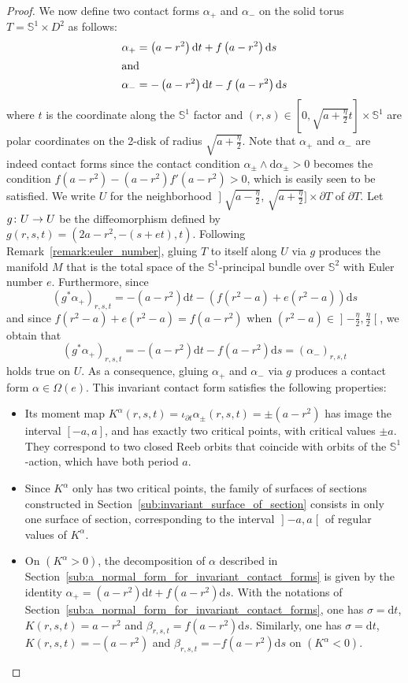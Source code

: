 \documentclass[AHL,Unicode,longabstracts]{cedram}
\newcommand{\bbS}{\mathbb{S}}
\newcommand{\rmd}{\mathrm{d}}
\renewcommand*{\to}{\mathchoice{\longrightarrow}{\rightarrow}{\rightarrow}{\rightarrow}}
\newcommand{\bbS}{\mathbb{S}}
\begin{document}
\begin{proof}
We now define two contact forms $\alpha_+$ and $\alpha_-$ on the solid torus $T = \bbS^1 \times D^2$ as follows:
\begin{align*}
\alpha_+ &= \left(a-r^2\right)\rmd t + f\left(a-r^2\right) \rmd s
\\
\intertext{and}
\alpha_- &= -\left(a-r^2\right)\rmd t - f\left(a-r^2\right) \rmd s
\end{align*}
where $t$ is the coordinate along the $\bbS^1$ factor and $(r,s) \in [0, \sqrt{a+\frac{\eta}{2}}t] \times \bbS^1$ are polar coordinates on the 2-disk of radius $\sqrt{a+ \frac{\eta}{2}}$. Note that $\alpha_+$ and $\alpha_-$ are indeed contact forms since the contact condition $\alpha_\pm \wedge \rmd  \alpha_\pm > 0$ becomes the condition $f(a-r^2) - (a-r^2) f'(a-r^2) >0$, which is easily seen to be satisfied. We write $U$ for the neighborhood $\mathopen{]}\sqrt{a-\frac{\eta}{2}}$, $\sqrt{a+\frac{\eta}{2}}\mathclose{]} \times \partial T$ of $\partial T$. Let $g \colon U \to U$ be the diffeomorphism defined by $g(r,s,t) = (2a-r^2,-(s+et),t)$. Following Remark~\ref{remark:euler_number}, gluing $T$ to itself along $U$ via $g$ produces the manifold $M$ that is the total space of the $\bbS^1$-principal bundle over $\bbS^2$ with Euler number $e$. Furthermore, since
\[
\left(g^* \alpha_+\right)_{r,s,t} = -\left(a-r^2\right) \rmd t - \left(f\left(r^2-a\right) + e\left(r^2-a\right)\right) \rmd s
\]
and since $f(r^2-a) + e (r^2-a) = f(a-r^2)$ when $(r^2-a) \in\mathopen{]}- \frac{\eta}{2}, \frac{\eta}{2}\mathclose{[}$, we obtain that
\[
(g^* \alpha_+)_{r,s,t} = - \left(a-r^2\right) \rmd t - f\left(a-r^2\right) \rmd s = (\alpha_-)_{r,s,t}
\]
holds true on $U$. As a consequence, gluing $\alpha_+$ and $\alpha_-$ via $g$ produces a contact form $\alpha \in \Omega(e)$. This invariant contact form satisfies the following properties:
\begin{itemize}
\item Its moment map $K^\alpha(r,s,t) = \iota_{\partial t} \alpha_{\pm}(r,s,t) = \pm (a-r^2)$ has image the interval $[-a,a]$, and has exactly two critical points, with critical values $\pm a$. They correspond to two closed Reeb orbits that coincide with orbits of the $\bbS^1$-action, which have both period $a$.
\item Since $K^\alpha$ only has two critical points, the family of surfaces of sections constructed in Section~\ref{sub:invariant_surface_of_section} consists in only one surface of section, corresponding to the interval $\mathopen{]}-a,a\mathclose{[}$ of regular values of $K^\alpha$.
\item On $(K^\alpha>0)$, the decomposition of $\alpha$ described in Section~\ref{sub:a_normal_form_for_invariant_contact_forms} is given by the identity $\alpha_+ = (a-r^2)\rmd t + f(a-r^2) \rmd s$. With the notations of Section~\ref{sub:a_normal_form_for_invariant_contact_forms}, one has $\sigma = \rmd t$, $K(r,s,t)=a-r^2$ and $\beta_{r,s,t} = f(a-r^2)\rmd s$. Similarly, one has $\sigma = \rmd t$, $K(r,s,t)=-(a-r^2)$ and $\beta_{r,s,t} = -f(a-r^2)\rmd s$ on $(K^\alpha < 0)$.

\end{itemize}
\end{proof}
\end{document}
